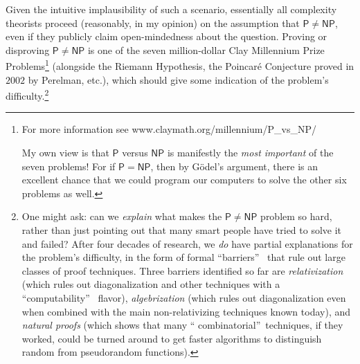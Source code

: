 \documentclass[12pt,onecolumn]{article}%
\begin{document}
Given the intuitive implausibility of such a scenario, essentially all
complexity theorists proceed (reasonably, in my opinion) on the assumption
that $\mathsf{P}\neq\mathsf{NP}$, even if they publicly claim open-mindedness
about the question. Proving or disproving $\mathsf{P}\neq\mathsf{NP}$ is
one of the seven million-dollar Clay Millennium Prize Problems\footnote{For
more information see www.claymath.org/millennium/P\_vs\_NP/
\par
My own view is that $\mathsf{P} $ versus $\mathsf{NP}$ is manifestly the
\textit{most important} of the seven problems! For if $\mathsf{P}%
=\mathsf{NP}$, then by G\"{o}del's argument, there is an excellent chance that
we could program our computers to solve the other six problems as well.}
(alongside the Riemann Hypothesis, the Poincar\'{e} Conjecture proved in
$2002$ by Perelman, etc.), which should give some indication of the problem's
difficulty.\footnote{One might ask: can we \textit{explain} what makes the
$\mathsf{P}\neq\mathsf{NP}$ problem so hard, rather than just pointing out
that many smart people have tried to solve it and failed? After four decades
of research, we \textit{do} have partial explanations for the problem's
difficulty, in the form of formal \textquotedblleft barriers\textquotedblright\ %
 that rule out large classes of proof techniques. Three barriers identified
so far are \textit{relativization} \cite{bgs} (which rules out diagonalization
and other techniques with a \textquotedblleft computability\textquotedblright\ %
 flavor), \textit{algebrization} \cite{awig} (which rules out diagonalization
even when combined with the main non-relativizing techniques known today), and
\textit{natural proofs} \cite{rr} (which shows that many \textquotedblleft
combinatorial\textquotedblright\  techniques, if they worked, could be turned
around to get faster algorithms to distinguish random from pseudorandom
functions).}
\end{document}
